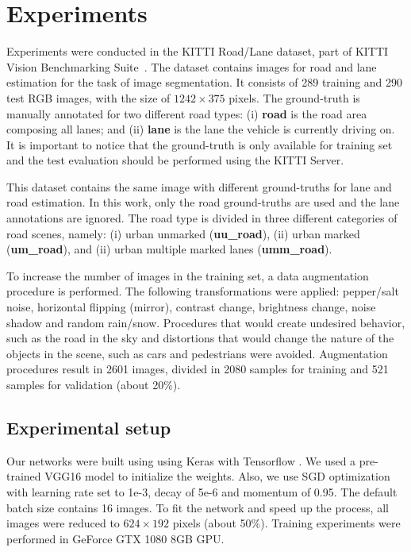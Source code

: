 \section{Experiments}
\label{sec:experiments}

Experiments were conducted in the KITTI Road/Lane dataset, part of KITTI Vision Benchmarking Suite~\cite{KITTI}. The dataset  contains  images for road and lane estimation for the task of image segmentation. It consists of 289 training and 290 test RGB images, with the size of $1242 \times 375$ pixels. The ground-truth is manually annotated for two different road types: (i) \textbf{road} is the road area composing all lanes; and (ii) \textbf{lane} is the lane the vehicle is currently driving on. It is important to notice that the ground-truth is only available for training set and the test evaluation should be performed using the KITTI Server.


This dataset contains the same image with different ground-truths for lane and road estimation. In this work, only the road ground-truths are used and the lane annotations are ignored. The road type is divided in three different categories of road scenes, namely: (i) urban unmarked (\textbf{uu\_road}), (ii) urban marked (\textbf{um\_road}), and (ii) urban multiple marked lanes (\textbf{umm\_road}).  


To increase the number of images in the training set, a data augmentation procedure is performed. The following transformations were applied: pepper/salt noise, horizontal flipping (mirror), contrast change, brightness change, noise shadow and random rain/snow. Procedures that would create undesired behavior, such as the road in the sky and distortions that would change the nature of the objects in the scene, such as cars and pedestrians were avoided. Augmentation procedures result in 2601 images, divided in 2080 samples for training and 521 samples for validation (about 20\%). 


\subsection{Experimental setup}
   
Our networks were built using using Keras \cite{chollet2015keras} with Tensorflow \cite{tensorflow2015-whitepaper}. We used a pre-trained VGG16 model to initialize the weights. Also, we use SGD optimization with learning rate set to 1e-3, decay of 5e-6 and momentum of 0.95. The default batch size contains 16 images. To fit the network and speed up the process, all images were reduced to $624 \times 192$ pixels (about 50\%). Training experiments were performed in GeForce GTX 1080 8GB GPU.

